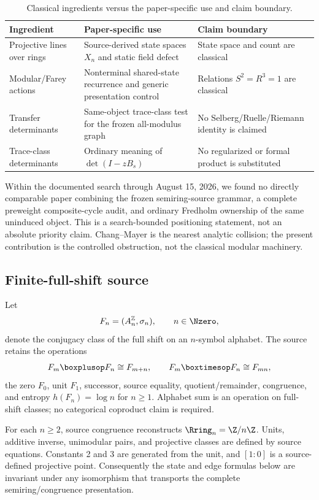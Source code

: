 \begin{table}[t]
\centering
\caption{Classical ingredients versus the paper-specific use and claim
boundary.}
\label{tab:literature-boundary}
\small
\begin{tabularx}{\textwidth}{L{0.23\textwidth}YY}
\toprule
Ingredient & Paper-specific use & Claim boundary \\
\midrule
Projective lines over rings & Source-derived state spaces $X_n$ and static
field defect & State space and count are classical \\
Modular/Farey actions & Nonterminal shared-state recurrence and generic
presentation control & Relations $S^2=R^3=1$ are classical \\
Transfer determinants & Same-object trace-class test for the frozen
all-modulus graph & No Selberg/Ruelle/Riemann identity is claimed \\
Trace-class determinants & Ordinary meaning of $\det(I-zB_s)$ & No
regularized or formal product is substituted \\
\bottomrule
\end{tabularx}
\end{table}

Within the documented search through August 15, 2026, we found no directly
comparable paper combining the frozen semiring-source grammar, a complete
preweight composite-cycle audit, and ordinary Fredholm ownership of the same
uninduced object.  This is a search-bounded positioning statement, not an
absolute priority claim.  Chang--Mayer is the nearest analytic collision;
the present contribution is the controlled obstruction, not the classical
modular machinery.

\subsection{Finite-full-shift source}

Let
\[
 F_n=(A_n^{\mathbb Z},\sigma_n),\qquad n\in\Nzero,
\]
denote the conjugacy class of the full shift on an $n$-symbol alphabet.  The
source retains the operations
\[
 F_m\boxplusop F_n\cong F_{m+n},\qquad
 F_m\boxtimesop F_n\cong F_{mn},
\]
the zero $F_0$, unit $F_1$, successor, source equality,
quotient/remainder, congruence, and entropy $h(F_n)=\log n$ for $n\ge1$.
Alphabet sum is an operation on full-shift classes; no categorical coproduct
claim is required.

For each $n\ge2$, source congruence reconstructs
$\Rring_n=\Z/n\Z$.  Units, additive inverse, unimodular pairs, and projective
classes are defined by source equations.  Constants 2 and 3 are generated
from the unit, and $[1:0]$ is a source-defined projective point.  Consequently
the state and edge formulas below are invariant under any isomorphism that
transports the complete semiring/congruence presentation.

